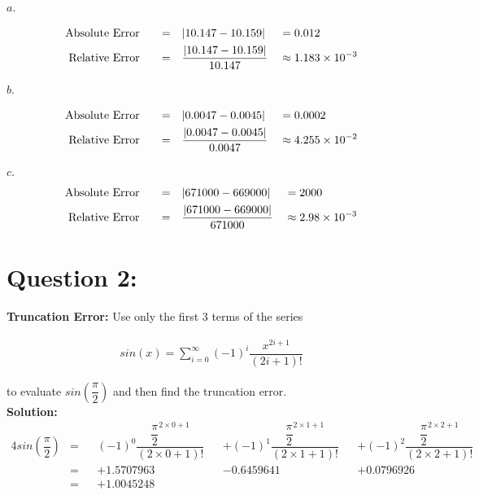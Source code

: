 \documentclass[a4paper,12pt]{article}
\begin{document}
{\color{red}\textbf{  \indent \(a.\)}}

	\begin{alignat}{3}
  	\text{Absolute Error \quad\ } &=& &| 10.147 -  10.159|& &= 0.012\\
  	\text{Relative Error \quad\ } &=&  &\frac{|10.147 - 10.159 |}{10.147}& &\approx 1.183\times 10^{-3}
	\end{alignat}
  
	{\color{red}\textbf{ \indent \(b.\)}}

 	\begin{alignat}{3}
  	\text{Absolute Error \quad\ } &=&  &| 0.0047 -  0.0045|& &= 0.0002 \\ 
  	\text{Relative Error \quad\ } &=&   &\frac{|0.0047 - 0.0045 |}{0.0047}& &\approx 4.255\times 10^{-2}
  	\end{alignat}
  

{\color{red}\textbf{  \indent \(c.\)}}
 \begin{alignat}{3}
  \text{Absolute Error \quad\ } &=&  &| 671000 - 669000 |& &= 2000 \\ 
  \text{Relative Error \quad\ } &=&   &\frac{|671000 - 669000 |}{671000}& &\approx 2.98\times 10^{-3}
  \end{alignat}
  
  
\newpage



\section*{\LARGE Question 2:}
	 \textbf{\Large Truncation Error:}
	 Use only the first 3 terms of the series
	 
	 \begin{align*}
		sin(x) = \sum_{i=0}^{\infty} (-1)^i \dfrac{x^{2i+1}}{(2i+1)!}
	 \end{align*}
	 
	 to evaluate \(sin(\dfrac{\pi}{2})\) and then find the truncation error.\\[0.5cm]
	{\color{blue}\textbf{Solution: \\[0.5cm]}}
	\begin{alignat*}{4}
		sin(\dfrac{\pi}{2}) &=& &(-1)^0 \dfrac{\dfrac{\pi}{2}^{2 \times 0 +1}}{(2\times 0 +1)!}& &+(-1)^1 \dfrac{\dfrac{\pi}{2}^{2 \times 1 +1}}{(2\times 1 +1)!}& &+(-1)^2 \dfrac{\dfrac{\pi}{2}^{2 \times 2 +1}}{(2\times 2 +1)!}\\ 
		&=& &+1.5707963& &-0.6459641& &+0.0796926\\
		&=& &+1.0045248\\
	\end{alignat*}
	
\end{document}
